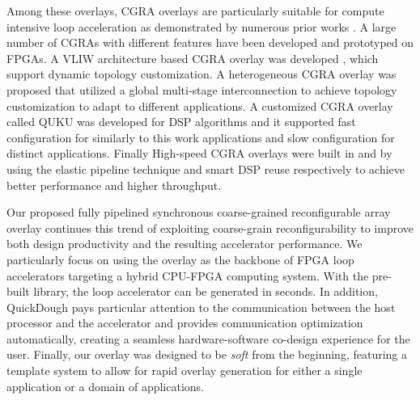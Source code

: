 Among these overlays, CGRA overlays are particularly suitable for compute intensive loop acceleration as demonstrated by numerous prior works \cite{tessier2001reconfigurable,compton2002reconfigurable}. A large number of CGRAs with different features have been developed and prototyped on FPGAs. A VLIW architecture based CGRA overlay was developed  \cite{kissler2006dynamically}, which support dynamic topology customization. A heterogeneous CGRA overlay was proposed \cite{ferreira2011fpga} that utilized a global multi-stage interconnection to achieve topology customization 
to adapt to different applications. A customized CGRA overlay called QUKU \cite{shukla2006quku} was developed for DSP algorithms and it supported fast configuration for similarly to this work applications and slow configuration for distinct applications. Finally High-speed CGRA overlays were built in \cite{capalijia2013pipelined} and \cite{dsp2015cgra} by using the elastic pipeline technique and smart DSP reuse respectively to achieve better performance and higher throughput.

Our proposed fully pipelined synchronous coarse-grained reconfigurable array overlay continues this trend of exploiting coarse-grain reconfigurability to improve both design productivity and the resulting accelerator performance. We particularly focus on using the overlay as the backbone of FPGA loop accelerators targeting a hybrid CPU-FPGA computing system. With the pre-built library, the loop accelerator can be generated in seconds. In addition, QuickDough pays particular attention to the communication between the host processor and the accelerator and provides communication optimization automatically, creating a seamless hardware-software co-design experience for the user. Finally, our overlay was designed to be \emph{soft} from the beginning, featuring a template system to allow for rapid overlay generation for either a single application or a domain of applications. 
